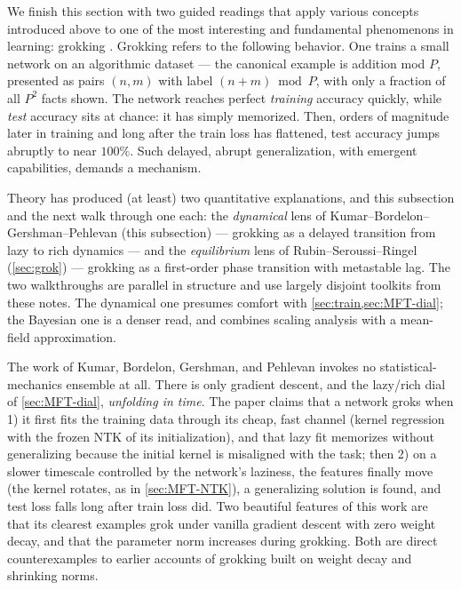 \documentclass[11pt]{article}
\begin{document}
We finish this section with two guided readings that apply various concepts introduced above to one of the most interesting and fundamental phenomenons in learning: grokking \cite{power2022grokking}. Grokking refers to the following behavior.  One trains a small network on an algorithmic dataset --- the canonical example is addition mod $P$, presented as pairs $(n,m)$ with label $(n+m)\bmod P$, with only a fraction of all $P^2$ facts shown. The network reaches perfect \emph{training} accuracy quickly, while \emph{test} accuracy sits at chance: it has simply memorized. Then, orders of magnitude later in training and long after the train loss has flattened, test accuracy jumps abruptly to near $100\%$. Such delayed, abrupt generalization, with emergent capabilities, demands a mechanism.

Theory has produced (at least) two quantitative explanations, and this subsection and the next walk through one each: the \emph{dynamical} lens of Kumar--Bordelon--Gershman--Pehlevan \cite{kumar2024grokking} (this subsection) --- grokking as a delayed transition from lazy to rich dynamics --- and the \emph{equilibrium} lens of Rubin--Seroussi--Ringel \cite{rubin2024grokking} (\cref{sec:grok}) --- grokking as a first-order phase transition with metastable lag. The two walkthroughs are parallel in structure and use largely disjoint toolkits from these notes. The dynamical one presumes comfort with \cref{sec:train,sec:MFT-dial}; the Bayesian one is a denser read, and combines scaling analysis with a mean-field approximation. 

\medskip
The work of Kumar, Bordelon, Gershman, and Pehlevan \cite{kumar2024grokking} invokes no statistical-mechanics ensemble at all.  There is only gradient descent, and the lazy/rich dial of \cref{sec:MFT-dial}, \emph{unfolding in time}. The paper claims that a network groks when 1) it first fits the training data through its cheap, fast channel (kernel regression with the frozen NTK of its initialization), and that lazy fit memorizes without generalizing because the initial kernel is misaligned with the task; then 2) on a slower timescale controlled by the network's laziness, the features finally move (the kernel rotates, as in \cref{sec:MFT-NTK}), a generalizing solution is found, and test loss falls long after train loss did. Two beautiful features of this work are that its clearest examples grok under vanilla gradient descent with zero weight decay, and that the parameter norm increases during grokking. Both are direct counterexamples to earlier accounts of grokking built on weight decay and shrinking norms.
\end{document}
